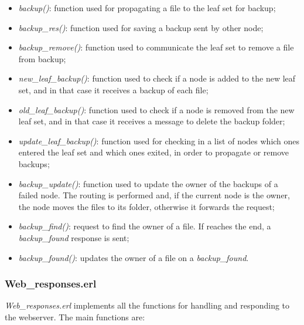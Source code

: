 \documentclass{article}
\begin{document}
\begin{itemize}
    \item \textit{backup()}: function used for propagating a file to the leaf set for backup;
    \item \textit{backup\_res()}: function used for saving a backup sent by other node;
    \item \textit{backup\_remove()}: function used to communicate the leaf set to remove a file from backup;
    \item \textit{new\_leaf\_backup()}: function used to check if a node is added to the new leaf set, 
    and in that case it receives a backup of each file;
    \item \textit{old\_leaf\_backup()}: function used to check if a node is removed from the new leaf set, 
    and in that case it receives a message to delete the backup folder;
    \item \textit{update\_leaf\_backup()}: function used for checking in a list of nodes which
    ones entered the leaf set and which ones exited, in order to propagate or remove backups;
    \item \textit{backup\_update()}: function used to update the owner of the backups of a failed node.
    The routing is performed and, if the current node is the owner, the node moves the files to its folder,
    otherwise it forwards the request;
    \item \textit{backup\_find()}: request to find the owner of a file. If reaches the end, a \textit{backup\_found} 
    response is sent;
    \item \textit{backup\_found()}: updates the owner of a file on a \textit{backup\_found}.
\end{itemize}


\subsubsection{Web\_responses.erl}

\textit{Web\_responses.erl} implements all the functions for handling and responding to the webserver.
The main functions are:
\end{document}

